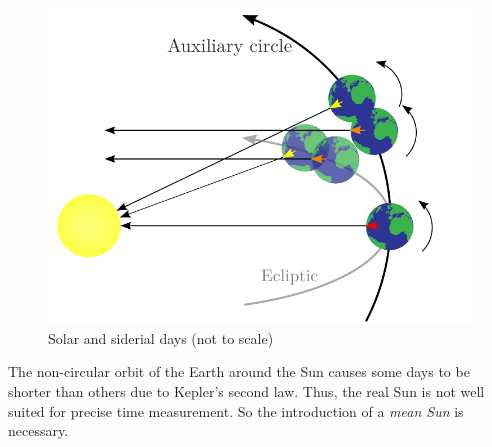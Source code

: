 \documentclass[../main.tex]{subfiles}
\begin{document}
\begin{figure}[htbp]
\begin{minipage}[ht]{0.48\textwidth}
    \includegraphics[width=\textwidth]{Images/siderial.pdf}
    \caption{Solar and siderial days (not to scale)}
    \label{fig:siderial}
  \end{minipage}
\end{figure}
The non-circular orbit of the Earth around the Sun causes some days to be shorter than others due to Kepler's second law. Thus, the real Sun is not well suited for precise time measurement. So the introduction of a \emph{mean Sun} is necessary.
\end{document}
